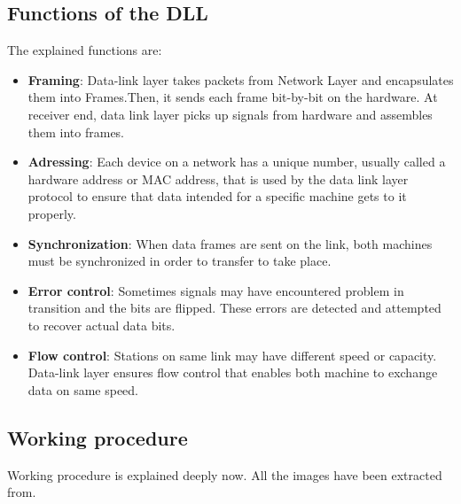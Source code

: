 %
\subsection{Functions of the DLL}
The explained functions are:
\begin{itemize}
\item \textbf{Framing}: Data-link layer takes packets from Network Layer and encapsulates them into Frames.Then, it sends each frame bit-by-bit on the hardware. At receiver end, data link layer picks up signals from hardware and assembles them into frames.
\item \textbf{Adressing}: Each device on a network has a unique number, usually called a hardware address or MAC address, that is used by the data link layer protocol to ensure that data intended for a specific machine gets to it properly.
\item \textbf{Synchronization}: When data frames are sent on the link, both machines must be synchronized in order to transfer to take place.
\item \textbf{Error control}: Sometimes signals may have encountered problem in transition and the bits are flipped. These errors are detected and attempted to recover actual data bits.
\item \textbf{Flow control}: Stations on same link may have different speed or capacity. Data-link layer ensures flow control that enables both machine to exchange data on same speed. 
 \end{itemize}
\subsection{Working procedure}
Working procedure is explained deeply now. All the images have been extracted from\cite{Forouzan2012}.
